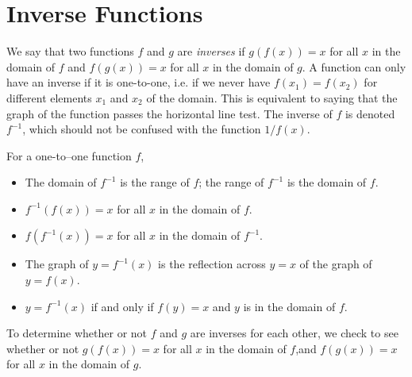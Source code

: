 \section{Inverse Functions}\label{sec:inv_funcs}

We say that two functions $f$ and $g$ are \emph{inverses} if $g(f(x))=x$ for all $x$ in the domain of $f$ and $f(g(x))=x$ for all $x$ in the domain of $g$. A function can only have an inverse if it is one-to-one, i.e. if we never have $f(x_1)=f(x_2)$ for different elements $x_1$ and $x_2$ of the domain. This is equivalent to saying that the graph of the function passes the horizontal line test.
%
The inverse of $f$ is denoted $f^{-1}$, which should not be confused with the function $1/f(x)$.

\begin{keyidea}\label{ki_inv_funcs}%
For a one-to–one function $f$,
\begin{itemize}
\item The domain of $f^{-1}$ is the range of $f$; the range of $f^{-1}$ is the domain of $f$.
\item $f^{-1}(f(x))=x$ for all $x$ in the domain of $f$.
\item $f(f^{-1}(x))=x$ for all $x$ in the domain of $f^{-1}$.
\item The graph of $y=f^{-1}(x)$ is the reflection across $y=x$ of the graph of $y=f(x)$.
\item $y=f^{-1}(x)$ if and only if $f(y)=x$ and $y$ is in the domain of $f$.
\end{itemize}
\end{keyidea}


To determine whether or not $f$ and $g$ are inverses for each other, we check to see whether or not $g(f(x))=x$ for all $x$ in the domain of $f$,and $f(g(x))=x$ for all $x$ in the domain of $g$.

